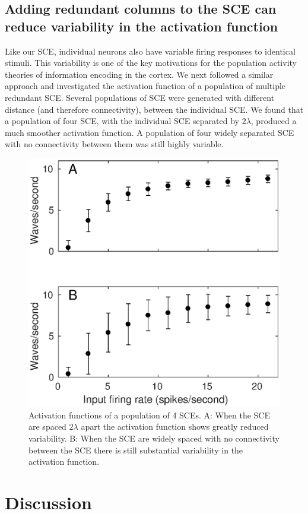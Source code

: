 \documentclass[12pt]{article}
\begin{document}
\FloatBarrier

\subsection*{Adding redundant columns to the SCE can reduce variability in the activation function}
Like our SCE, individual neurons also have variable firing responses to identical stimuli.
This variability is one of the key motivations for the population activity theories of information encoding in the cortex.
We next followed a similar approach and investigated the activation function of a population of multiple redundant SCE.
Several populations of SCE were generated with different distance (and therefore connectivity), between the individual SCE.
We found that a population of four SCE, with the individual SCE separated by $2\lambda$, produced a much smoother activation function.
A population of four widely separated SCE with no connectivity between them was still highly variable.


\begin{figure}[!htb]
 \centering
 \includegraphics[width=\textwidth]{fig/OneLambdaFourLambda}
 \caption{Activation functions of a population of 4 SCEs. 
	    A: When the SCE are spaced $2\lambda$ apart the activation function shows greatly reduced variability. 
	    B: When the SCE are widely spaced with no connectivity between the SCE there is still substantial variability in the activation function.}
 \label{fig:sce_4x4_coupled_activation_function}
\end{figure}

\FloatBarrier

\section{Discussion}


\clearpage
\printbibliography
\end{document}
